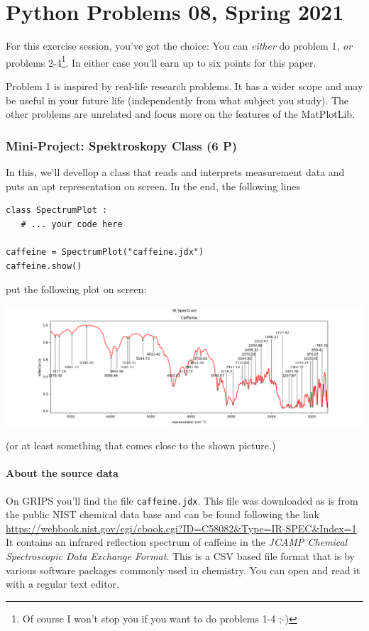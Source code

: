 \documentclass[
	english,
	fontsize=10pt,
	parskip=half,
	titlepage=true,
	DIV=12
]{scrartcl}
\begin{document}
\part*{Python Problems 08, Spring 2021}
For this exercise session, you've got the choice: You can \emph{either} do problem 1, \emph{or} problems 2-4\footnote{Of course I won't stop you if you want to do problems 1-4 ;-)}. In either case you'll earn up to six points for this paper.

Problem 1 is inspired by real-life research problems. It has a wider scope and may be useful in your future life (independently from what subject you study). The other problems are unrelated and focus more on the features of the MatPlotLib.

\section{Mini-Project: Spektroskopy Class (6 P)}
In this, we'll devellop a class that reads and interprets measurement data and puts an apt representation on screen. In the end, the following lines
\begin{verbatim}
class SpectrumPlot :
   # ... your code here

caffeine = SpectrumPlot("caffeine.jdx")
caffeine.show()
\end{verbatim}
put the following plot on screen:

\includegraphics[width=\linewidth]{./task1-endresult}
\label{fig:SpectrumCaffeine}

(or at least something that comes close to the shown picture.)

\subsection{About the source data}
On GRIPS you'll find the file \texttt{caffeine.jdx}. This file was downloaded as is from the public NIST chemical data base and can be found following the link \url{https://webbook.nist.gov/cgi/cbook.cgi?ID=C58082&Type=IR-SPEC&Index=1}. It contains an infrared reflection spectrum of caffeine in the \emph{JCAMP Chemical Spectroscopic Data Exchange Format}. This is a CSV based file format that is by various software packages commonly used in chemistry. You can open and read it with a regular text editor.
\end{document}
